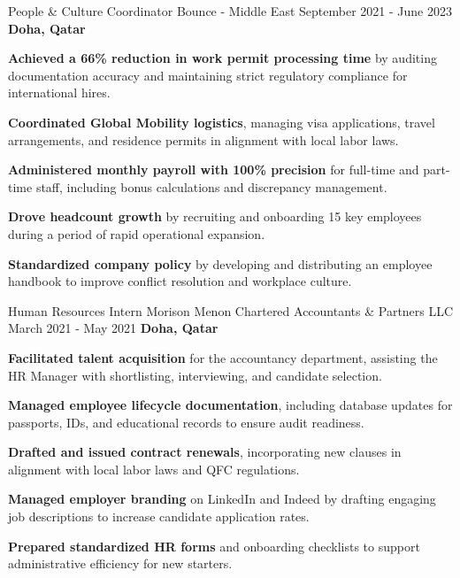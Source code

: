 \begin{cventries}
    \cventry
    {People \& Culture Coordinator} %
    {Bounce - Middle East} %
    {September 2021 - June 2023} %
    {\textbf{Doha, Qatar}} %
    { 
        \begin{cvitems}
            \item \textbf{Achieved a 66\% reduction in work permit processing time} by auditing documentation accuracy and maintaining strict regulatory compliance for international hires.
            \item \textbf{Coordinated Global Mobility logistics}, managing visa applications, travel arrangements, and residence permits in alignment with local labor laws.
            \item \textbf{Administered monthly payroll with 100\% precision} for full-time and part-time staff, including bonus calculations and discrepancy management.
            \item \textbf{Drove headcount growth} by recruiting and onboarding 15 key employees during a period of rapid operational expansion.
            \item \textbf{Standardized company policy} by developing and distributing an employee handbook to improve conflict resolution and workplace culture.
        \end{cvitems}
    }

    \cventry
    {Human Resources Intern} %
    {Morison Menon Chartered Accountants \& Partners LLC} %
    {March 2021 - May 2021} %
    {\textbf{Doha, Qatar}} %
    {
        \begin{cvitems}
            \item \textbf{Facilitated talent acquisition} for the accountancy department, assisting the HR Manager with shortlisting, interviewing, and candidate selection.
            \item \textbf{Managed employee lifecycle documentation}, including database updates for passports, IDs, and educational records to ensure audit readiness.
            \item \textbf{Drafted and issued contract renewals}, incorporating new clauses in alignment with local labor laws and QFC regulations.
            \item \textbf{Managed employer branding} on LinkedIn and Indeed by drafting engaging job descriptions to increase candidate application rates.
            \item \textbf{Prepared standardized HR forms} and onboarding checklists to support administrative efficiency for new starters.
        \end{cvitems}
    }
\end{cventries}
